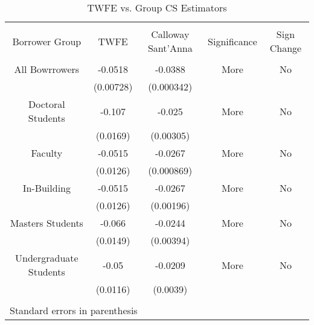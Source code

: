 
\begin{table}[h] \centering 
  \caption{TWFE vs. Group CS Estimators} 
  \label{} 
\begin{tabular}{@{\extracolsep{5pt}} ccccc} 
\\[-1.8ex]\hline 
\hline \\[-1.8ex] 
Borrower Group & TWFE & Calloway Sant'Anna & Significance & Sign Change \\ 
\hline \\[-1.8ex] 
All Bowrrowers & -0.0518 & -0.0388 & More & No \\ 
 & (0.00728) & (0.000342) &  &  \\ 
Doctoral Students & -0.107 & -0.025 & More & No \\ 
 & (0.0169) & (0.00305) &  &  \\ 
Faculty & -0.0515 & -0.0267 & More & No \\ 
 & (0.0126) & (0.000869) &  &  \\ 
In-Building & -0.0515 & -0.0267 & More & No \\ 
 & (0.0126) & (0.00196) &  &  \\ 
Masters Students & -0.066 & -0.0244 & More & No \\ 
 & (0.0149) & (0.00394) &  &  \\ 
Undergraduate Students & -0.05 & -0.0209 & More & No \\ 
 & (0.0116) & (0.0039) &  &  \\ 
\hline \\[-1.8ex] 
\multicolumn{5}{l}{Standard errors in parenthesis} \\ 
\end{tabular} 
\end{table} 
